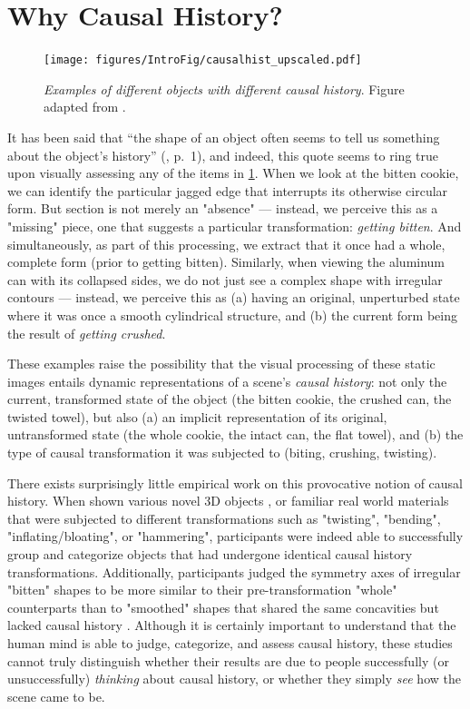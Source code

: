 \section{Why Causal History?}
\begin{figure}
    \centering
    \texttt{[image: figures/IntroFig/causalhist\_upscaled.pdf]}
    \caption
    {\textit{Examples of different objects with different causal history}. Figure adapted from \cite{chen_perception_2016}.}
    \label{fig:IntroFig_2}
\end{figure}

It has been said that “the shape of an object often seems to tell us something about the object's history” (\cite{leyton_inferring_1989}, p.~1), and indeed, this quote seems to ring true upon visually assessing any of the items in \cref{fig:IntroFig_2}.  When we look at the bitten cookie, we can identify the particular jagged edge that interrupts its otherwise circular form.  But section is not merely an "absence" --- instead, we perceive this as a "missing" piece, one that suggests a particular transformation: \textit{getting bitten}.  And simultaneously, as part of this processing, we extract that it once had a whole, complete form (prior to getting bitten). Similarly, when viewing the aluminum can with its collapsed sides, we do not just see a complex shape with irregular contours --- instead, we perceive this as (a) having an original, unperturbed state where it was once a smooth cylindrical structure, and (b) the current form being the result of \textit{getting crushed}.

These examples raise the possibility that the visual processing of these static images entails dynamic representations of a scene's \textit{causal history}:  not only the current, transformed state of the object (the bitten cookie, the crushed can, the twisted towel), but also (a) an implicit representation of its original, untransformed state (the whole cookie, the intact can, the flat towel), and (b) the type of causal transformation it was subjected to (biting, crushing, twisting).  

There exists surprisingly little empirical work on this provocative notion of causal history. When shown various novel 3D objects \parencite{fleming_getting_2019, schmidt_visual_2019}, or familiar real world materials \parencite{schmidt_identifying_2018}  that were subjected to different transformations such as "twisting", "bending", "inflating/bloating", or "hammering", participants were indeed able to successfully group and categorize objects that had undergone identical causal history transformations. Additionally, participants judged the symmetry axes of irregular "bitten" shapes to be more similar to their pre-transformation "whole" counterparts than to "smoothed" shapes that shared the same concavities but lacked causal history \parencite{sprote_visual_2016}. Although it is certainly important to understand that the human mind is able to judge, categorize, and assess causal history, these studies cannot truly distinguish whether their results are due to people successfully (or unsuccessfully) \textit{thinking} about causal history, or whether they simply \textit{see} how the scene came to be.

